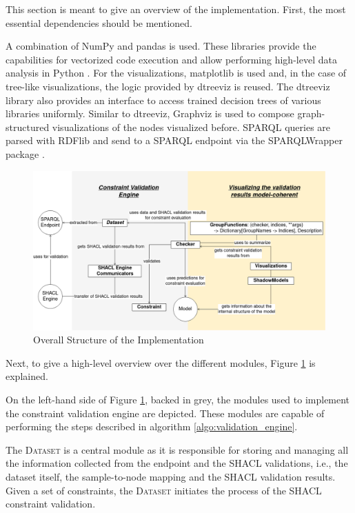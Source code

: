 This section is meant to give an overview of the implementation. First, the most essential dependencies should be mentioned.

A combination of NumPy and pandas is used. These libraries provide the capabilities for vectorized code execution \cite{numpy} and allow performing high-level data analysis in Python \cite{pandas}. 
For the visualizations, matplotlib \cite{matplotlib} is used and, in the case of tree-like visualizations, the logic provided by dtreeviz \cite{dtreeviz} is reused. The dtreeviz library also provides an interface to access trained decision trees of various libraries uniformly. Similar to dtreeviz, Graphviz \cite{graphviz} is used to compose graph-structured visualizations of the nodes visualized before. SPARQL queries are parsed with RDFlib \cite{rdflib} and send to a SPARQL endpoint via the SPARQLWrapper package \cite{sparqlwrapper}.

\begin{figure}
    \centering
    \includegraphics[scale=.35]{images/implementation/class_diagram_collapsed.png}
    \caption{Overall Structure of the Implementation}
    \label{fig:structure_of_the_implementation}
\end{figure}

Next, to give a high-level overview over the different modules, Figure \ref{fig:structure_of_the_implementation} is explained. 

On the left-hand side of Figure \ref{fig:structure_of_the_implementation}, backed in grey, the modules used to implement the constraint validation engine are depicted. These modules are capable of performing the steps described in algorithm \ref{algo:validation_engine}. 

The \textsc{Dataset} is a central module as it is responsible for storing and managing all the information collected from the endpoint and the SHACL validations, i.e., the dataset itself, the sample-to-node mapping and the SHACL validation results. Given a set of constraints, the \textsc{Dataset} initiates the process of the SHACL constraint validation.

